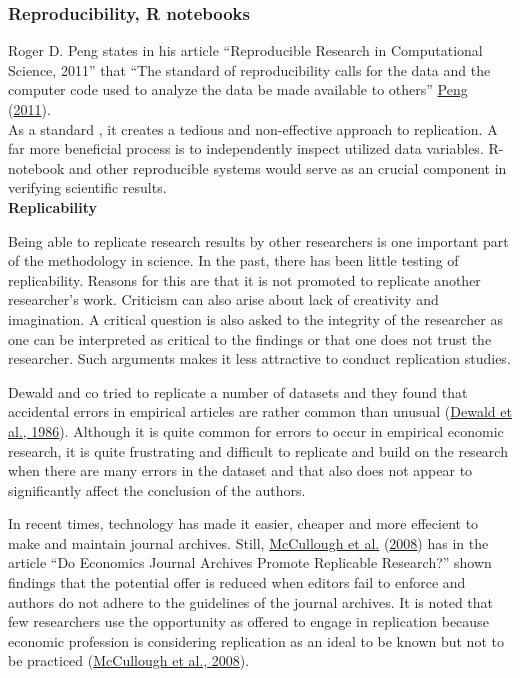 \documentclass[
  12pt,
  norsk,
]{article}
\begin{document}
\hypertarget{reproducibility-r-notebooks}{%
\subsubsection{Reproducibility, R
notebooks}\label{reproducibility-r-notebooks}}

Roger D. Peng states in his article ``Reproducible Research in
Computational Science, 2011'' that ``The standard of reproducibility
calls for the data and the computer code used to analyze the data be
made available to others'' \protect\hyperlink{ref-peng2011}{Peng}
(\protect\hyperlink{ref-peng2011}{2011}).\\
As a standard , it creates a tedious and non-effective approach to
replication. A far more beneficial process is to independently inspect
utilized data variables. R-notebook and other reproducible systems would
serve as an crucial component in verifying scientific results.\\

\textbf{Replicability}

Being able to replicate research results by other researchers is one
important part of the methodology in science. In the past, there has
been little testing of replicability. Reasons for this are that it is
not promoted to replicate another researcher's work. Criticism can also
arise about lack of creativity and imagination. A critical question is
also asked to the integrity of the researcher as one can be interpreted
as critical to the findings or that one does not trust the researcher.
Such arguments makes it less attractive to conduct replication studies.

Dewald and co tried to replicate a number of datasets and they found
that accidental errors in empirical articles are rather common than
unusual (\protect\hyperlink{ref-dewald1986}{Dewald et al., 1986}).
Although it is quite common for errors to occur in empirical economic
research, it is quite frustrating and difficult to replicate and build
on the research when there are many errors in the dataset and that also
does not appear to significantly affect the conclusion of the authors.

In recent times, technology has made it easier, cheaper and more
effecient to make and maintain journal archives. Still,
\protect\hyperlink{ref-mccullough2008}{McCullough et al.}
(\protect\hyperlink{ref-mccullough2008}{2008}) has in the article ``Do
Economics Journal Archives Promote Replicable Research?'' shown findings
that the potential offer is reduced when editors fail to enforce and
authors do not adhere to the guidelines of the journal archives. It is
noted that few researchers use the opportunity as offered to engage in
replication because economic profession is considering replication as an
ideal to be known but not to be practiced
(\protect\hyperlink{ref-mccullough2008}{McCullough et al., 2008}).
\end{document}
